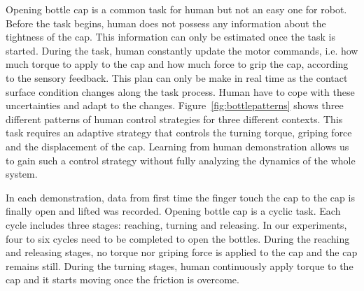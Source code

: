 
Opening bottle cap is a common task for human but not an easy one for robot. Before the task begins, human does not possess any information about the tightness of the cap. This information can only be estimated once the task is started.
During the task, human constantly update the motor commands, i.e. how much torque to apply to the cap and how much force to grip the cap, according to the sensory feedback. This plan can only be make in real time as the contact surface condition changes along the task process. Human have to cope with these uncertainties and adapt to the changes. Figure~\ref{fig:bottlepatterns} shows three different patterns of human control strategies for three different contexts. This task requires an adaptive strategy that controls the turning torque, griping force and the displacement of the cap. Learning from human demonstration allows us to gain such a control strategy without fully analyzing the dynamics of the whole system.

In each demonstration, data from first time the finger touch the cap to the cap is finally open and lifted was recorded. Opening bottle cap is a cyclic task. Each cycle includes three stages: reaching, turning and releasing. In our experiments, four to six cycles need to be completed to open the bottles. During the reaching and releasing stages, no torque nor griping force is applied to the cap and the cap remains still. During the turning stages, human continuously apply torque to the cap and it starts moving once the friction is overcome.

